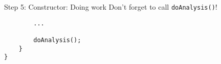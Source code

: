 \begin{slide}{Step 5: Constructor: Doing work}
\vspace*{-0.1in}
Don't forget to call {\tt doAnalysis()}!

\vspace*{0.05in}
\begin{verbatim}
        ...

        doAnalysis();
    }
}
\end{verbatim}
\end{slide}


